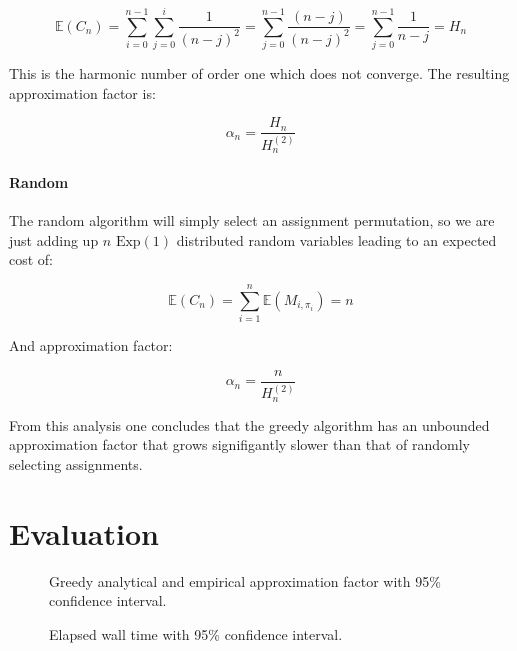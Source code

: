 \documentclass{article}
\newcommand{\expected}[1]{\mathbb{E} \left ( #1 \right )}
\newcommand{\exprv}[1]{\text{Exp} \left( #1 \right )}
\begin{document}
\begin{equation}
	\expected{C_n} = \sum_{i=0}^{n-1} \sum_{j=0}^{i} \frac{1}{(n - j)^2} = \sum_{j=0}^{n-1} \frac{(n-j)}{(n-j)^2} = \sum_{j=0}^{n-1} \frac{1}{n-j} = H_n
\end{equation}

This is the harmonic number of order one which does not converge. The resulting approximation factor is:

\begin{equation}
	\alpha_n = \frac{H_n}{H_n^{(2)}}
\end{equation}

\paragraph{Random}

The random algorithm will simply select an assignment permutation, so we are just adding up $n$ $\exprv{1}$ distributed random variables leading to an expected cost of: 

\begin{equation}
	\expected{C_n} = \sum_{i=1}^n \expected{ M_{i, \pi_i} } = n
\end{equation}

And approximation factor:

\begin{equation}
	\alpha_n = \frac{n}{H_n^{(2)}}
\end{equation}

From this analysis one concludes that the greedy algorithm has an unbounded approximation factor that grows signifigantly slower than that of randomly selecting assignments.

\newpage
\section{Evaluation}

\begin{multicols}{2}
\begin{figure}[H]
	\centering
	\resizebox{\linewidth}{!}{}
	\caption{Greedy analytical and empirical approximation factor with 95\% confidence interval.}
	\label{fig:approximationFactor}
\end{figure}

\columnbreak

\begin{figure}[H]
	\centering
	\resizebox{\linewidth}{!}{}
	\caption{Elapsed wall time with 95\% confidence interval.}
	\label{fig:runtime}
\end{figure}
\end{multicols}
\end{document}
